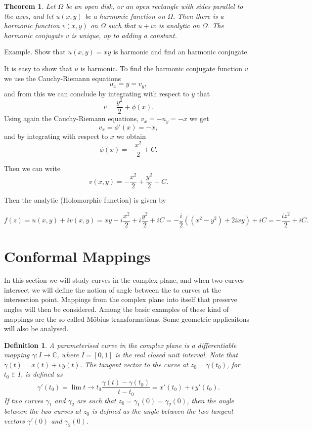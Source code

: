 \documentclass{amsart}
\newtheorem{thm}{Theorem}
\newtheorem{mydef}{Definition}
\begin{document}
\begin{thm}
Let \(\Omega\) be an open disk, or an open rectangle with sides parallel
to the axes, and let \(u(x,y)\) be a harmonic function on \(\Omega\). Then there is
a harmonic function \(v(x,y)\) on \(\Omega\) such that \(u + iv\) is analytic on \(\Omega\). The
harmonic conjugate \(v\) is unique, up to adding a constant.
\end{thm}


\alert{Example}. Show that \(u(x,y) = xy\) is harmonic and find an harmonic conjugate.

It is easy to show that \(u\) is harmonic. To find the harmonic conjugate function \(v\) we use the Cauchy-Riemann equations
\[ u_x = y = v_y,\]
and from this we can conclude by integrating with respect to \(y\) that
\[ v = \frac{y^2}{2} + \phi(x). \]
Using again the Cauchy-Riemann equations, \(v_x = - u_y = -x\) we get
\[ v_x = \phi'(x) = -x,\]
and by integrating with respect to \(x\) we obtain
\[ \phi(x)  = -\frac{x^2 }{2} + C. \]

Then we can write
\[ v(x,y) = -\frac{x^2 }{2} + \frac{y^2 }{2} + C. \]

Then the analytic (Holomorphic function) is given by 

\[ f(z) = u(x,y) + i v(x,y) = xy  -i \frac{x^2 }{2} + i\frac{y^2 }{2} + iC = -\frac{i}{2} \left((x^2  - y^2) + 2ixy\right) + i C = -\frac{iz^2}{2} + iC. \]


\section{Conformal Mappings}
\label{sec:org2846479}

In this section we will study curves in the complex plane, and when two curves intersect we will define the notion of angle between the to curves at the intersection point. Mappings from the complex plane into itself that preserve angles will then be considered. Among the basic examples of these kind of mappings are the so called Möbius transformations. Some geometric applicaitons will also be analysed.

\begin{mydef}
A parameterised curve in the complex plane is a differentiable mapping \(\gamma:I\to\mathbb{C}\), where \(I= [0,1]\) is the real closed unit interval. Note that \(\gamma(t) = x(t) + i\, y(t)\). The tangent vector to the curve at \(z_0 = \gamma(t_0)\), for \(t_0 \in I\), is defined as
\[ \gamma'(t_0) = \lim{t\to t_0} \frac{\gamma(t) - \gamma(t_0)}{t - t_0} = x'(t_0)  + i\, y'(t_0). \]
If two curves \(\gamma_1\) and \(\gamma_2\) are such that \(z_0 = \gamma_1(0) = \gamma_2(0)\), then the angle between the two curves at \(z_0\) is defined as the angle between the two tangent vectors \(\gamma'(0)\) and \(\gamma_2(0)\).
\end{mydef}
\end{document}
